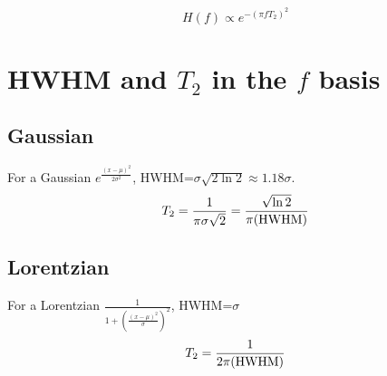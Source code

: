 \documentclass[a4paper]{article}
\begin{document}
\begin{equation}
H(f) \propto e^{-(\pi f T_2)^2}
\end{equation}

\section{HWHM and $T_2$ in the $f$ basis}
\subsection{Gaussian}
For a Gaussian $e^{\frac{(x-\mu)^2}{2\sigma^2}}$, HWHM=$\sigma \sqrt{2 \ln 2} \approx 1.18\sigma$.
\begin{equation}
T_2=\frac{1}{\pi \sigma \sqrt{2}}=\frac{\sqrt{\ln 2}}{\pi \rm (HWHM)}
\end{equation}

\subsection{Lorentzian}
For a Lorentzian $\frac{1}{1+(\frac{(x-\mu)^2}{\sigma})^2}$, HWHM=$\sigma$
\begin{equation}
T_2=\frac{1}{2\pi \rm (HWHM)}
\end{equation}
\end{document}
